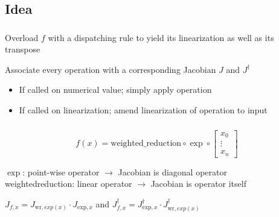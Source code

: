 \documentclass[aspectratio=169,xcolor=dvipsnames]{beamer}
\begin{document}
\subsection{Idea}
\begin{frame}
	\frametitle{\insertsection}
	\framesubtitle{\insertsubsection}

	Overload $f$ with a dispatching rule to yield its linearization as well as its transpose

	\pause
	\vspace{2em}
	Associate every operation with a corresponding Jacobian $J$ and $J^\dagger$
	\begin{itemize}
		\item If called on numerical value; simply apply operation
		\item If called on linearization; amend linearization of operation to input
	\end{itemize}

\end{frame}

\begin{frame}
	\frametitle{\insertsection}
	\framesubtitle{\insertsubsection}

	\begin{equation*}
		f(x) =
		\text{weighted\_reduction}
		\circ
		\exp
		\circ
		\begin{bmatrix}
			x_{0} \\
			\vdots \\
			x_{n}
		\end{bmatrix}
	\end{equation*}

	\vspace{1em}
	$\exp$: point-wise operator $\rightarrow$ Jacobian is diagonal operator
	\\ weighted\textunderscore{}reduction: linear operator $\rightarrow$ Jacobian is operator itself

	\vspace{2em}
	\begin{center}
		$J_{f,x} = J_{\text{wr},exp(x)} \cdot J_{\text{exp},x}$
		\hspace{2em}
		and
		\hspace{2em}
		$J_{f,x}^\dagger = J_{\text{exp},x}^\dagger \cdot J_{\text{wr},exp(x)}^\dagger$
	\end{center}

\end{frame}
\end{document}
